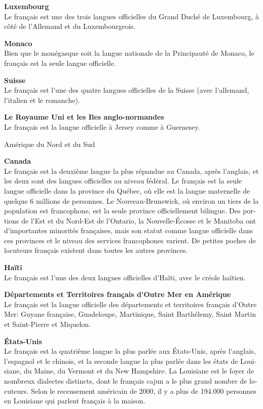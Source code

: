 \begin{french}
\begin{multicols}{2}
{\bf Luxembourg}\\
Le français est une des trois langues officielles du Grand Duché de
Luxembourg, à côté de l{\mbox '}Allemand et du Luxembourgeois.

{\bf Monaco}\\ 
Bien que le monégasque soit la langue nationale de la Principauté de
Monaco, le français est la seule langue officielle.

{\bf Suisse}\\
Le français est l{\mbox '}une des quatre langues officielles de la
Suisse (avec l{\mbox '}allemand, l{\mbox '}italien et le romanche).

{\bf Le Royaume Uni et les Iles  anglo-normandes}\\
Le français est la langue officielle à Jersey comme à Guernesey.

\begin{center}
{\sc Amérique du Nord et du Sud}
\end{center}

{\bf Canada}\\
Le français est la deuxième langue la plus répandue au Canada, après
l{\mbox '}anglais, et les deux sont des langues officielles au niveau
fédéral. Le français est la seule langue officielle dans la province
du Québec, où elle est la langue maternelle de quelque 6 millions de
personnes. Le Nouveau-Brunswick, où environ un tiers de la population
est francophone, est la seule province officiellement bilingue. Des
portions de l{\mbox '}Est et du Nord-Est de l{\mbox '}Ontario, la
Nouvelle-Écosse et le Manitoba ont d{\mbox '}importantes minorités françaises,
mais son statut comme langue officielle dans ces provinces et le
niveau des services francophones varient. De petites poches de
locuteurs français existent dans toutes les autres provinces.

{\bf Haïti}\\
Le français est l{\mbox '}une des deux langues officielles d{\mbox
 '}Haïti, avec le créole haïtien.

{\bf Départements et Territoires français d{\mbox '}Outre Mer en Amérique}\\
Le français est la langue officielle des départements et territoires
français d{\mbox '}Outre Mer: Guyane française, Guadeloupe,
Martinique, Saint Barthélemy, Saint Martin et Saint-Pierre et
Miquelon.

{\bf États-Unis}\\
Le français est la quatrième langue la plus parlée aux États-Unis,
après l{\mbox '}anglais, l{\mbox '}espagnol et le chinois, et la
seconde langue la plus parlée dans les états de Louisiane, du Maine,
du Vermont et du New Hampshire. La Louisiane est le foyer de nombreux
dialectes distincts, dont le français cajun a le plus grand nombre de
locuteurs. Selon le recensement américain de 2000, il y a plus de
194.000 personnes en Louisiane qui parlent français à la maison.


\end{multicols}
\end{french}
